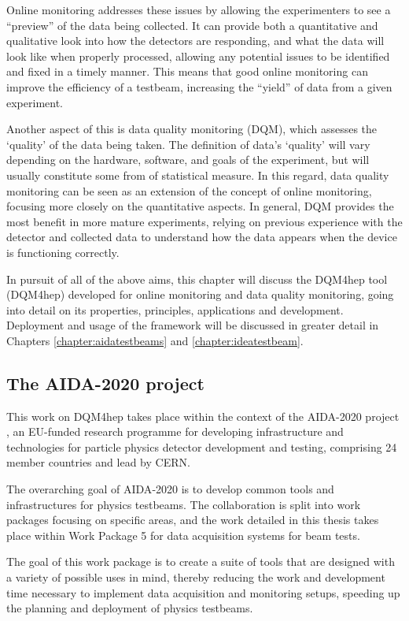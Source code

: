 Online monitoring addresses these issues by allowing the experimenters to see a ``preview'' of the data being collected. It can provide both a quantitative and qualitative look into how the detectors are responding, and what the data will look like when properly processed, allowing any potential issues to be identified and fixed in a timely manner. This means that good online monitoring can improve the efficiency of a testbeam, increasing the ``yield'' of data from a given experiment.

Another aspect of this is data quality monitoring (\acrshort{DQM}), which assesses the `quality' of the data being taken. The definition of data's `quality' will vary depending on the hardware, software, and goals of the experiment, but will usually constitute some from of statistical measure. In this regard, data quality monitoring can be seen as an extension of the concept of online monitoring, focusing more closely on the quantitative aspects. In general, \acrshort{DQM} provides the most benefit in more mature experiments, relying on previous experience with the detector and collected data to understand how the data appears when the device is functioning correctly.  

In pursuit of all of the above aims, this chapter will discuss the \acrlong{DQM4hep} tool (\acrshort{DQM4hep}) developed for online monitoring and data quality monitoring, going into detail on its properties, principles, applications and development. Deployment and usage of the framework will be discussed in greater detail in Chapters \ref{chapter:aidatestbeams} and \ref{chapter:ideatestbeam}.

\subsection{The \acrshort{AIDA}-2020 project}
This work on \acrshort{DQM4hep} takes place within the context of the \acrshort{AIDA}-2020 project \cite{aida-2020}, an EU-funded research programme for developing infrastructure and technologies for particle physics detector development and testing, comprising 24 member countries and lead by \acrshort{CERN}.

The overarching goal of \acrshort{AIDA}-2020 is to develop common tools and infrastructures for physics testbeams. The collaboration is split into work packages focusing on specific areas, and the work detailed in this thesis takes place within Work Package 5 for data acquisition systems for beam tests.

The goal of this work package is to create a suite of tools that are designed with a variety of possible uses in mind, thereby reducing the work and development time necessary to implement data acquisition and monitoring setups, speeding up the planning and deployment of physics testbeams. 

